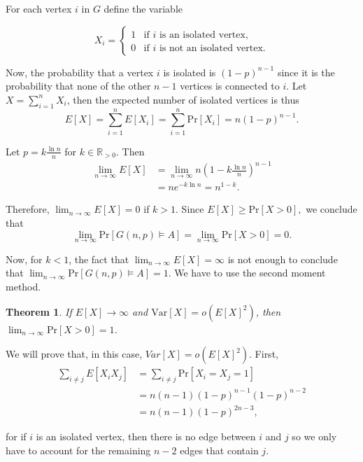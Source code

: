 \documentclass[12pt]{article}
\newtheorem*{theorem*}{Theorem}
\theoremstyle{definition}
\theoremstyle{remark}
\def\R{\ensuremath{\mathbb{R}}}
\def\Pr{\ensuremath{\mbox{Pr}}}
\begin{document}
For each vertex $i$ in $G$ define the variable 

\[X_i = 
\left\{
	\begin{array}{ll}
		1  & \mbox{if } i \text{ is an isolated vertex,} \\
		0 & \mbox{if } i \text{ is not an isolated vertex.}
	\end{array}
\right.
\]

Now, the probability that a vertex $i$ is isolated is $(1 - p)^{n - 1}$ since it is the probability that none of the other $n - 1$ vertices is connected to $i$. Let $X = \sum_{i = 1}^n X_i$, then the expected number of isolated vertices is thus \[E[X] = \sum_{i = 1}^{n} E[X_i] = \sum_{i = 1}^{n} \Pr[X_i] = n(1 - p)^{n - 1}.\]

Let $\displaystyle{p = k\frac{\ln n}{n}}$ for $k \in \R_{>0}$. Then
\begin{align*}
    \lim_{n \to \infty} E[X] &= \lim_{n \to \infty} n\left(1 - k\frac{\ln n}{n}\right)^{n - 1} \\
    &= ne^{-k\ln n} = n^{1 - k}.
\end{align*}

Therefore, $\lim_{n \to \infty} E[X] = 0$ if $k > 1$. Since \(E[X] \geq \Pr[X > 0],\) we conclude that \[\lim_{n \to \infty} \Pr[G(n, p) \vDash A] =  \lim_{n \to \infty} \Pr[X > 0] = 0.\] \par
Now, for $k < 1$, the fact that $\lim_{n \to \infty} E[X] = \infty$ is not enough to conclude that \(\lim_{n \to \infty} \Pr[G(n, p) \vDash A] = 1\). We have to use the second moment method. \par

\begin{theorem*}
    If $E[X] \to \infty$ and $\text{Var}[X] = o(E[X]^2)$, then $\lim_{n \to \infty} \Pr[X > 0] = 1$. \cite{alon2016probabilistic}
\end{theorem*}

We will prove that, in this case, $Var[X] = o(E[X]^2)$. First, 
\begin{align*}
    \sum_{i \neq j}E[X_iX_j] &= \sum_{i \neq j} \Pr[X_i = X_j = 1] \\
    &= n(n - 1)(1 - p)^{n -1}(1 - p)^{n - 2} \\ &= n(n - 1)(1 - p)^{2n - 3},
\end{align*}

for if $i$ is an isolated vertex, then there is no edge between $i$ and $j$ so we only have to account for the remaining $n - 2$ edges that contain $j$.  \par
\end{document}
